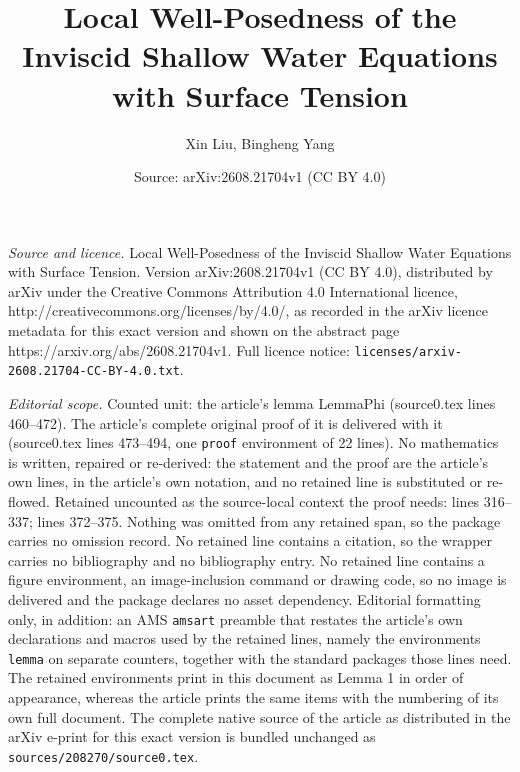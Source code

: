 \documentclass[10pt,a4paper]{amsart}
\title{Local Well-Posedness of the Inviscid Shallow Water Equations with Surface Tension}
\author{Xin Liu, Bingheng Yang}
\date{Source: arXiv:2608.21704v1 (CC BY 4.0)}
\begin{document}
\maketitle

\noindent\emph{Source and licence.} Local Well-Posedness of the Inviscid Shallow Water Equations with Surface Tension. Version arXiv:2608.21704v1 (CC BY 4.0), distributed by arXiv under the Creative Commons Attribution 4.0 International licence, http://creativecommons.org/licenses/by/4.0/, as recorded in the arXiv licence metadata for this exact version and shown on the abstract page https://arxiv.org/abs/2608.21704v1. Full licence notice: \texttt{licenses/arxiv-2608.21704-CC-BY-4.0.txt}.\par\smallskip

\noindent\textit{Editorial scope.} Counted unit: the article's lemma LemmaPhi (source0.tex lines 460--472). The article's complete original proof of it is delivered with it (source0.tex lines 473--494, one \texttt{proof} environment of 22 lines). No mathematics is written, repaired or re-derived: the statement and the proof are the article's own lines, in the article's own notation, and no retained line is substituted or re-flowed.  Retained uncounted as the source-local context the proof needs: lines 316--337; lines 372--375.  Nothing was omitted from any retained span, so the package carries no omission record.  No retained line contains a citation, so the wrapper carries no bibliography and no bibliography entry.  No retained line contains a figure environment, an image-inclusion command or drawing code, so no image is delivered and the package declares no asset dependency.  Editorial formatting only, in addition: an AMS \texttt{amsart} preamble that restates the article's own declarations and macros used by the retained lines, namely the environments \texttt{lemma} on separate counters, together with the standard packages those lines need.  The retained environments print in this document as Lemma 1 in order of appearance, whereas the article prints the same items with the numbering of its own full document.  The complete native source of the article as distributed in the arXiv e-print for this exact version is bundled unchanged as \texttt{sources/208270/source0.tex}.
\end{document}
